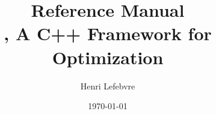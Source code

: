 \documentclass[a4paper, american, reqno]{amsbook}
\begin{document}
\title[\idol: A C++ Framework for Optimization]{Reference Manual\\\idol, A C++ Framework for Optimization}

\author[H. Lefebvre]{Henri Lefebvre}

\address[Henri Lefebvre]{Trier University, Department of Mathematics, Universitätsring 15, 54296 Trier, Germany}


\date{\today}

\maketitle



\printbibliography
\end{document}
